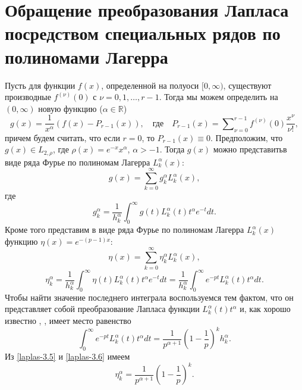\section{Обращение преобразования Лапласа посредством специальных рядов по полиномами Лагерра}
Пусть для функции $f(x)$, определенной на полуоси $[0,\infty)$, существуют производные $f^{(\nu)}(0)$ с $\nu=0,1,\ldots, r-1$. Тогда мы можем определить на $(0,\infty)$  новую функцию ($\alpha\in\mathbb{R}$)
\begin{equation}\label{laplas-3.1}
g(x)=\frac{1}{x^\alpha}(f(x)-P_{r-1}(x)),\quad \text{где} \quad P_{r-1}(x)=\sum\nolimits_{\nu=0}^{r-1}f^{(\nu)}(0)\frac{x^\nu}{\nu!},
\end{equation}
причем будем считать, что если $r=0$, то $P_{r-1}(x)\equiv0$. Предположим, что $g(x)\in L_{2,\rho}$, где $\rho(x)=e^{-x}x^\alpha$, $\alpha>-1$.
Тогда  $g(x)$ можно представитьв виде ряда Фурье по  полиномам Лагерра $L_k^\alpha(x)$:
\begin{equation}\label{laplas-3.2}
g(x)=\sum_{k=0}^{\infty} g_k^\alpha L_k^\alpha(x),
\end{equation}
где
\begin{equation}\label{laplas-3.3}
 g_k^\alpha=\frac{1}{h_k^\alpha} \int_0^\infty g(t) L_k^\alpha(t)t^\alpha e^{-t}dt.
\end{equation}
Кроме того представим в виде ряда Фурье по полиномам Лагерра $L_k^\alpha(x)$  функцию $\eta(x)=e^{-(p-1)x}$:
\begin{equation}\label{laplas-3.4}
\eta(x)=\sum_{k=0}^{\infty} \eta_k^\alpha L_k^\alpha(x),
\end{equation}
\begin{equation}\label{laplas-3.5}
 \eta_k^\alpha=\frac{1}{h_k^\alpha} \int_0^\infty \eta(t) L_k^\alpha(t)t^\alpha e^{-t}dt=\frac{1}{h_k^\alpha} \int_0^\infty e^{-pt}L_k^\alpha(t)t^\alpha dt.
\end{equation}
Чтобы найти значение последнего интеграла воспользуемся тем фактом, что он представляет собой преобразование Лапласа функции
$L_k^\alpha(t)t^\alpha$ и, как хорошо известно \cite{DitPrud}, \cite{KrylovSkob}, имеет место равенство
\begin{equation}\label{laplas-3.6}
  \int_0^\infty e^{-pt}L_k^\alpha(t)t^\alpha dt=\frac{1}{p^{\alpha+1}}\left(1-\frac1p\right)^kh_k^\alpha.
\end{equation}
Из \eqref{laplas-3.5} и \eqref{laplas-3.6} имеем
\begin{equation}\label{laplas-3.7}
 \eta_k^\alpha=\frac{1}{p^{\alpha+1}}\left(1-\frac1p\right)^k.
\end{equation}
